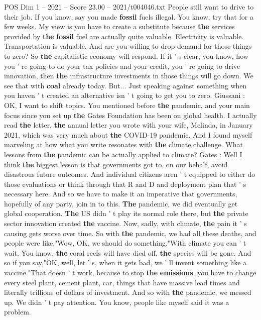 \begin{textsample}{POS Dim 1 – 2021 – Score 23.00 – 2021/t004046.txt}
People still want to drive to their job.
If you know, say you made \textbf{fossil} fuels illegal.
You know, try that for a few weeks.
My view is you have to create a substitute because \textbf{the} services provided by \textbf{the} \textbf{fossil} fuel are actually quite valuable.
Electricity is valuable.
Transportation is valuable.
And are you willing to drop demand for those things to zero?
So \textbf{the} capitalistic economy will respond.
If it ' s clear, you know, how you ' re going to do your tax policies and your credit, you ' re going to drive innovation, then \textbf{the} infrastructure investments in those things will go down.
We see that with \textbf{coal} already today.
But...
Just speaking against something when you haven ' t created an alternative isn ' t going to get you to zero.
Giussani : OK, I want to shift topics.
You mentioned before \textbf{the} pandemic, and your main focus since you set up \textbf{the} Gates Foundation has been on global health.
I actually read \textbf{the} letter, \textbf{the} annual letter you wrote with your wife, Melinda, in January 2021, which was very much about \textbf{the} COVID-19 pandemic.
And I found myself marveling at how what you write resonates with \textbf{the} climate challenge.
What lessons from \textbf{the} pandemic can be actually applied to climate?
Gates : Well I think \textbf{the} biggest lesson is that governments got to, on our behalf, avoid disastrous future outcomes.
And individual citizens aren ' t equipped to either do those evaluations or think through that R and D and deployment plan that ' s necessary here.
And so we have to make it an imperative that governments, hopefully of any party, join in to this. \textbf{The} pandemic, we did eventually get global cooperation. \textbf{The} US didn ' t play its normal role there, but \textbf{the} private sector innovation created \textbf{the} vaccine.
Now, sadly, with climate, \textbf{the} pain it ' s causing gets worse over time.
So with \textbf{the} pandemic, we had all these deaths, and people were like,"Wow, OK, we should do something."With climate you can ' t wait.
You know, \textbf{the} coral reefs will have died off, \textbf{the} species will be gone.
And so if you say,"OK, well, let ' s, when it gets bad, we ' ll invent something like a vaccine."That doesn ' t work, because to stop \textbf{the} \textbf{emissions}, you have to change every steel plant, cement plant, car, things that have massive lead times and literally trillions of dollars of investment.
And so with \textbf{the} pandemic, we messed up.
We didn ' t pay attention.
You know, people like myself said it was a problem.

\end{textsample}
